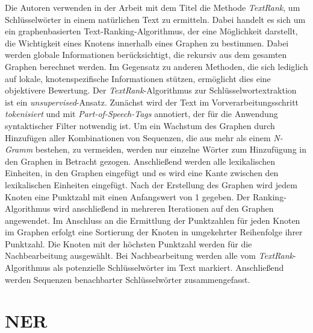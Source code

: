 Die Autoren \citeauthor{mihalcea2004textrank} verwenden in der Arbeit mit dem Titel \cite{mihalcea2004textrank} die Methode \emph{TextRank}, um Schlüsselwörter in einem natürlichen Text zu ermitteln. Dabei handelt es sich um ein graphenbasierten Text-Ranking-Algorithmus, der eine Möglichkeit darstellt, die Wichtigkeit eines Knotens innerhalb eines Graphen zu bestimmen. Dabei werden globale Informationen berücksichtigt, die rekursiv aus dem gesamten Graphen berechnet werden. Im Gegensatz zu anderen Methoden, die sich lediglich auf lokale, knotenspezifische Informationen stützen, ermöglicht dies eine objektivere Bewertung. Der \emph{TextRank}-Algorithmus zur Schlüsselwortextraktion
ist ein \emph{unsupervised}-Ansatz. Zunächst wird der Text im Vorverarbeitungsschritt \emph{tokenisiert} und mit \emph{Part-of-Speech-Tags} annotiert, der für die Anwendung syntaktischer Filter notwendig ist. Um ein Wachstum des Graphen durch Hinzufügen aller Kombinationen von Sequenzen, die aus mehr als einem \emph{N-Gramm} bestehen, zu vermeiden, werden nur einzelne Wörter zum Hinzufügung in den Graphen in Betracht gezogen. Anschließend werden alle lexikalischen Einheiten, in den Graphen eingefügt und es wird eine Kante zwischen den lexikalischen Einheiten eingefügt. Nach der Erstellung des Graphen wird jedem Knoten eine Punktzahl mit einen Anfangswert von 1 gegeben. Der Ranking-Algorithmus wird anschließend in mehreren Iterationen auf den Graphen angewendet. Im Anschluss an die Ermittlung der Punktzahlen für jeden Knoten im Graphen erfolgt eine Sortierung der Knoten in umgekehrter Reihenfolge ihrer Punktzahl. Die Knoten mit der höchsten Punktzahl werden für die Nachbearbeitung ausgewählt. Bei Nachbearbeitung werden alle vom \emph{TextRank}-Algorithmus als potenzielle Schlüsselwörter im Text markiert. Anschließend werden Sequenzen benachbarter Schlüsselwörter zusammengefasst.\\

\section{NER}

